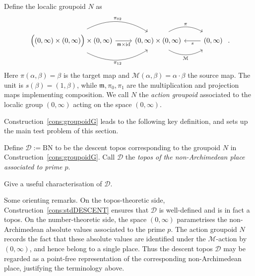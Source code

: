 \documentclass[a4paper, 11pt,reqno]{amsart}
\newcommand{\id}{\mathrm{id}}
\newcommand{\M}{\mathcal{M}}
\newcommand{\m}{\mathfrak{m}}
\newcommand{\D}{\mathcal{D}}
\begin{document}
\begin{construction}\label{cons:groupoidG} Define the localic groupoid $N$ as
	\begin{equation}\label{eq:simplicialLOCALP}
	\begin{tikzcd} \Big((0,\infty)\times (0,\infty) \Big) \times (0,\infty)\ar[r, bend right, shift right=1ex, swap, "\pi_{12}"] \ar[r,swap,"\m\times\id"] \ar[r,bend left, shift left=1ex,  "\pi_{02}"]& (0,\infty)\times (0,\infty) \ar[r, bend right,shift right=1ex, swap, "\M"] \ar[r, bend left, shift left=1ex, "\pi"] & (0,\infty) \ar[l, "s"] \end{tikzcd}\,\,.
	\end{equation}
Here $\pi(\alpha,\beta)=\beta$ is the target map and
$\M(\alpha,\beta)=\alpha\cdot \beta$ the source map. The unit is
$s(\beta)=(1,\beta)$, while $\m,\pi_0,\pi_1$ are the multiplication and projection maps implementing composition. We call $N$ the {\em action groupoid} associated to the localic group $(0,\infty)$ acting on the space $(0,\infty)$.
\end{construction}

Construction~\ref{cons:groupoidG} leads to the following key definition, and sets up the main test problem of this section.

\begin{definition}\label{def:STDdescent} Define $\mathcal{D}:=\mathrm{BN}$ to be the descent topos corresponding to the groupoid $N$ in Construction~\ref{cons:groupoidG}. Call $\D$ the \emph{topos of the non-Archimedean place associated to prime $p$}. 
\end{definition}

\begin{problem}\label{prob:STDdescent} Give a useful characterisation of $\D$.
\end{problem}



\begin{discussion}\label{dis:DefNA} Some orienting remarks. On the topos-theoretic side, Construction~\ref{cons:stdDESCENT} ensures that $\D$ is well-defined and is in fact a topos. On the number-theoretic side, the space $(0,\infty)$ parametrises the non-Archimedean absolute values associated to the prime $p$. The action groupoid $N$ records the fact that these absolute values are identified under the $\M$-action by $(0,\infty)$, and hence belong to a single place. Thus the descent topos $\D$ may be regarded as a point-free representation of the corresponding non-Archimedean place, justifying the terminology above.
\end{discussion}
\end{document}
